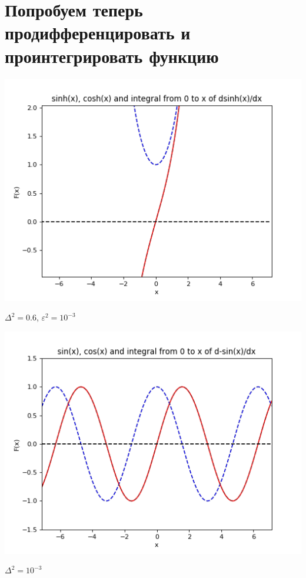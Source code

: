\documentclass[12pt,a4paper]{scrartcl}
\begin{document}
	\section{Попробуем теперь продифференцировать и проинтегрировать функцию}
		\begin{center}
			\includegraphics[scale=0.68]{figure_10} \\
		\end{center}
		$\Delta^2 = 0.6$, $\varepsilon^2 = 10^{-3}$
		\begin{center}
			\includegraphics[scale=0.68]{figure_11} \\
		\end{center}
		$\Delta^2 = 10^{-3}$
\end{document}
